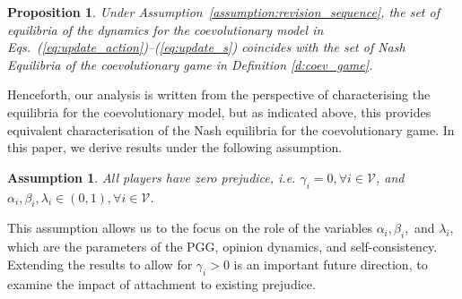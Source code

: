 \documentclass[letterpaper, 10 pt, conference]{ieeeconf}  %
\newcommand{\vect}[1]{\boldsymbol{#1}}
\newtheorem{remark}{Remark}
\newtheorem{assumption}{Assumption}
\newtheorem{proposition}{Proposition}
\begin{document}
\begin{proposition}
   Under Assumption~\ref{assumption:revision_sequence}, the set of equilibria of the dynamics for the coevolutionary model in Eqs.~(\ref{eq:update_action})--(\ref{eq:update_s}) coincides with the set of Nash Equilibria of the coevolutionary game in Definition \ref{d:coev_game}. 
\end{proposition}



Henceforth, our analysis is written from the perspective of characterising the equilibria for the coevolutionary model, but as indicated above, this provides equivalent characterisation of the Nash equilibria for the coevolutionary game. In this paper, we derive results under the following assumption.
\begin{assumption}\label{a:0}
    All players have zero prejudice, i.e. $\gamma_i = 0, \forall i \in \mathcal{V}$, and $\alpha_i, \beta_i, \lambda_i \in (0,1), \forall i \in \mathcal{V}$.
\end{assumption}
This assumption allows us to the focus on the role of the variables $\alpha_i, \beta_i,$ and $\lambda_i$, which are the parameters of the PGG, opinion dynamics, and self-consistency. Extending the results to allow for $\gamma_i > 0$ is an important future direction, to examine the impact of attachment to existing prejudice.
\end{document}
